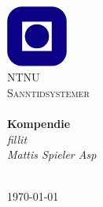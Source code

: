 \begin{titlepage}
\begin{center}
\includegraphics[width=0.15\textwidth]{img/NTNU.png}~\\[1cm]

\textsc{\LARGE NTNU}\\[1.5cm]

\textsc{\Large Sanntidsystemer}\\[0.5cm]

\HRule \\[0.4cm]
{ \huge \bfseries Kompendie}\\[0.5cm]
{\Large \textit{fillit}}\\[0.3cm]
{\large \textit{
Mattis Spieler Asp
}}\\[0.2cm]
\HRule \\[1.5cm]



\vfill

{\large \today}
\end{center}
\end{titlepage}
